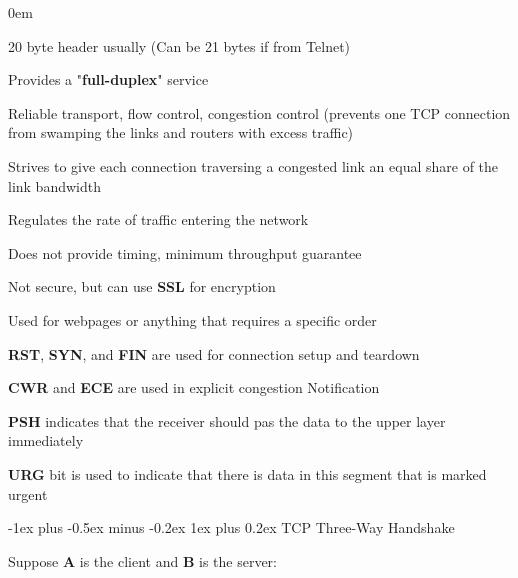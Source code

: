 \documentclass[letterpaper,8pt]{extarticle}
\makeatletter
\renewcommand{\subsubsection}{\@startsection{subsubsection}{3}{0mm}%
  {-1ex plus -0.5ex minus -0.2ex}%
  {1ex plus 0.2ex}%
{\color{h3} \normalfont\fontsize{5.5}{5.5}\selectfont\bfseries\itshape}}
\let\olditemize\itemize \let\endolditemize\enditemize
\renewenvironment{itemize}{\olditemize \itemsep0em}{\endolditemize}
\makeatother
\begin{document}
\begin{multicols*}{5}
\begin{multicols}{2}
    \columnbreak
    
    \vspace*{\fill}
    \begin{itemize}
      \item 20 byte header usually (Can be 21 bytes if from Telnet)
      \item Provides a "\textbf{full-duplex}" service
      \item Reliable transport, flow control, congestion control (prevents one TCP connection from swamping the links and routers with excess traffic)
      \item Strives to give each connection traversing a congested link an equal share of the link bandwidth
      \item Regulates the rate of traffic entering the network
      \item Does not provide timing, minimum throughput guarantee
      \item Not secure, but can use \textbf{SSL} for encryption
      \item Used for webpages or anything that requires a specific order
      \item \textbf{RST}, \textbf{SYN}, and \textbf{FIN} are used for connection setup and teardown
      \item \textbf{CWR} and \textbf{ECE} are used in explicit congestion Notification
      \item \textbf{PSH} indicates that the receiver should pas the data to the upper layer immediately
      \item \textbf{URG} bit is used to indicate that there is data in this segment that is marked urgent
    \end{itemize}
    \vspace*{\fill}
  \end{multicols}
  
  \subsubsection{TCP Three-Way Handshake}
  
  Suppose \textbf{A} is the client and \textbf{B} is the server:
  

\end{multicols*}
\end{document}
